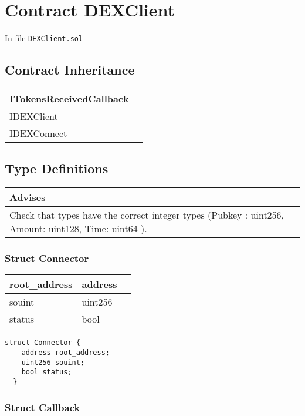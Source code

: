 
\chapter{Contract DEXClient}


In file {\tt DEXClient.sol}

\section{Contract Inheritance}


\noindent\begin{tabular}{|l|p{5cm}|}\hline
ITokensReceivedCallback & \\\hline
IDEXClient & \\\hline
IDEXConnect & \\\hline
\end{tabular}


\section{Type Definitions}


\ifsoldraft
\noindent\begin{tabular}{|p{12cm}|}\hline
\rowcolor{green}Advises
\\\hline
Check that types have the correct integer types (Pubkey : uint256, Amount: uint128, Time: uint64 ).
\\\hline\end{tabular}
\fi

\subsection{Struct Connector}


\ifsoltables
\noindent\begin{tabular}{|l|l|p{6cm}|}\hline
root\_{}address & address & \\\hline
souint & uint256 & \\\hline
status & bool & \\\hline
\end{tabular}
\fi


\begin{lstlisting}[firstnumber=29]
  struct Connector {
    address root_address;
    uint256 souint;
    bool status;
  }
\end{lstlisting}

\subsection{Struct Callback}


